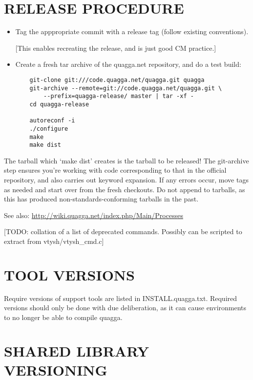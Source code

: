 \documentclass[oneside]{article}
\begin{document}
\section{RELEASE PROCEDURE}

\begin{itemize}
\item Tag the apppropriate commit with a release tag (follow existing
  conventions).
  
  [This enables recreating the release, and is just good CM practice.]

\item Create a fresh tar archive of the quagga.net repository, and do a test
  build:

  \begin{verbatim}
    git-clone git:///code.quagga.net/quagga.git quagga
    git-archive --remote=git://code.quagga.net/quagga.git \
        --prefix=quagga-release/ master | tar -xf -
    cd quagga-release

    autoreconf -i
    ./configure
    make
    make dist
  \end{verbatim}
\end{itemize}

The tarball which `make dist' creates is the tarball to be released! The
git-archive step ensures you're working with code corresponding to that in
the official repository, and also carries out keyword expansion. If any
errors occur, move tags as needed and start over from the fresh checkouts.
Do not append to tarballs, as this has produced non-standards-conforming
tarballs in the past.

See also: \url{http://wiki.quagga.net/index.php/Main/Processes}

[TODO: collation of a list of deprecated commands. Possibly can be scripted
to extract from vtysh/vtysh\_cmd.c]


\section{TOOL VERSIONS}

Require versions of support tools are listed in INSTALL.quagga.txt.
Required versions should only be done with due deliberation, as it can
cause environments to no longer be able to compile quagga.


\section{SHARED LIBRARY VERSIONING}
\label{sec:dll-versioning}
\end{document}
